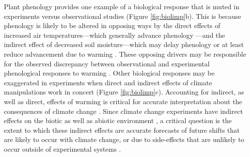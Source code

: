 \documentclass{article}
\begin{document}
\par Plant phenology provides one example of a biological response that is muted in experiments versus observational studies (Figure \ref{fig:biolimp}b). This is because phenology is likely to be altered in opposing ways by the direct effects of increased air temperatures---which generally advance phenology \citep{wolkovich2012}---and the indirect effect of decreased soil moisture---which may delay phenology or at least reduce advancement due to warming \citep{penuelas2004,ourcival2011,craine2012,matthews2016}. 
These opposing drivers may be responsible for the observed discrepancy between observational and experimental phenological responses to warming \citep{wolkovich2012}. Other biological responses may be exaggerated in experiments when direct and indirect effects of climate manipulations work in concert (Figure \ref{fig:biolimp}c). Accounting for indirect, as well as direct, effects of warming is critical for accurate interpretation about the consequences of climate change \citep{kharouba2015}. Since climate change experiments have indirect effects on the biotic as well as abiotic environment \citep{hoeppner2012,pelini2014,diamond2016}, a critical question is the extent to which these indirect effects are accurate forecasts of future shifts that are likely to occur with climate change, or due to side-effects that are unlikely to occur outside of experimental systems \citep{moise2010,diamond2013}.
\end{document}
